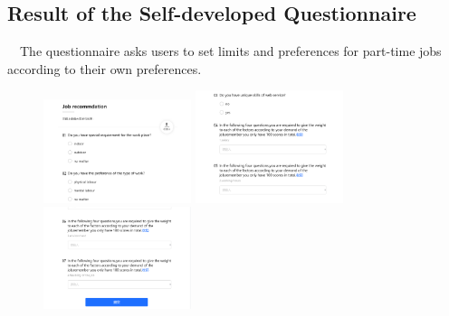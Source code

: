 \documentclass[12pt]{article}
\begin{document}
\begin{appendix}
    \section{Result of the Self-developed Questionnaire}
    ~~The questionnaire asks users to set limits and preferences for part-time jobs according to their own preferences.\\%
    \begin{figure}[!htbp]
        \centering
        {
        \begin{minipage}[t]{0.3\linewidth}
        \centering
        \includegraphics[width=1.7in]{figure/t1.png}
        \end{minipage}%
        }%
        {
        \begin{minipage}[t]{0.3\linewidth}
        \centering
        \includegraphics[width=1.7in]{figure/t2.png}
        \end{minipage}%
        }%
        {
        \begin{minipage}[t]{0.3\linewidth}
        \centering
        \includegraphics[width=1.7in]{figure/t3.png}
        \end{minipage}
        }%
        \end{figure}


\end{appendix}
\end{document}

